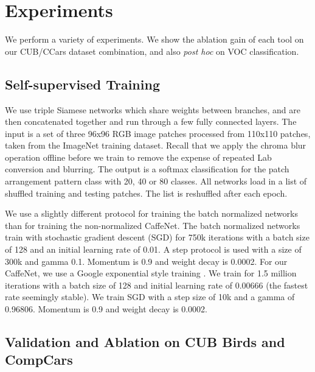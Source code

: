 \documentclass[10pt,twocolumn,letterpaper]{article}
\begin{document}
\section{Experiments}

We perform a variety of experiments. We show the ablation gain of each tool on our CUB/CCars dataset combination, and also \emph{post hoc} on VOC classification.

\subsection{Self-supervised Training}

We use triple Siamese networks which share weights between branches, and are then concatenated together and run through a few fully connected layers. The input is a set of three 96x96 RGB image patches processed from 110x110 patches, taken from the ImageNet training dataset. Recall that we apply the chroma blur operation offline before we train to remove the expense of repeated Lab conversion and blurring. The output is a softmax classification for the patch arrangement pattern class with 20, 40 or 80 classes. All networks load in a list of shuffled training and testing patches. The list is reshuffled after each epoch. 

We use a slightly different protocol for training the batch normalized networks than for training the non-normalized CaffeNet. The batch normalized networks train with stochastic gradient descent (SGD) for 750k iterations with a batch size of 128 and an initial learning rate of 0.01. A step protocol is used with a size of 300k and gamma 0.1. Momentum is 0.9 and weight decay is 0.0002. For our CaffeNet, we use a Google exponential style training \cite{Inceptionv4}. We train for 1.5 million iterations with a batch size of 128 and initial learning rate of 0.00666 (the fastest rate seemingly stable). We train SGD with a step size of 10k and a gamma of 0.96806. Momentum is 0.9 and weight decay is 0.0002. 

\subsection{Validation and Ablation on CUB Birds and CompCars}
\end{document}
